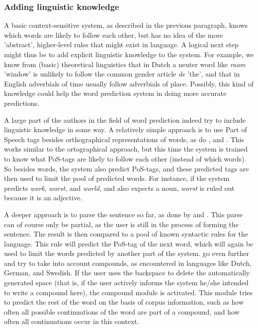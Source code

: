 \documentclass[11pt]{article}
\begin{document}
\subsubsection{Adding linguistic knowledge} \label{linguistic_knowledge}
A basic context-sensitive system, as described in the previous paragraph, knows which words are likely to follow each other, but has no idea of the more 'abstract', higher-level rules that might exist in language. A logical next step might thus be to add explicit linguistic knowledge to the system. For example, we know from (basic) theoretical linguistics that in Dutch a neuter word like \emph{raam} 'window' is unlikely to follow the common gender article \emph{de} 'the', and that in English adverbials of time usually follow adverbials of place. Possibly, this kind of knowledge could help the word prediction system in doing more accurate predictions.

A large part of the authors in the field of word prediction indeed try to include linguistic knowledge in some way. A relatively simple approach is to use Part of Speech tags besides orthographical representations of words, as do ,  and . This works similar to the ortographical approach, but this time the system is trained to know what PoS-tags are likely to follow each other (instead of which words). So besides words, the system also predict PoS-tags, and these predicted tags are then used to limit the pool of predicted words. For instance, if the system predicts \emph{work}, \emph{worst}, and \emph{world}, and also expects a noun, \emph{worst} is ruled out because it is an adjective.

A deeper approach is to parse the sentence so far, as done by  and . This parse can of course only be partial, as the user is still in the process of forming the sentence. The result is then compared to a pool of known syntactic rules for the language. This rule will predict the PoS-tag of the next word, which will again be used to limit the words predicted by another part of the system.  go even further and try to take into account compounds, as encountered in languages like Dutch, German, and Swedish. If the user uses the backspace to delete the automatically generated space (that is, if the user actively informs the system he/she intended to write a compound here), the compound module is activated. This module tries to predict the rest of the word on the basis of corpus information, such as how often all possible continuations of the word are part of a compound, and how often all continuations occur in this context.
\end{document}
